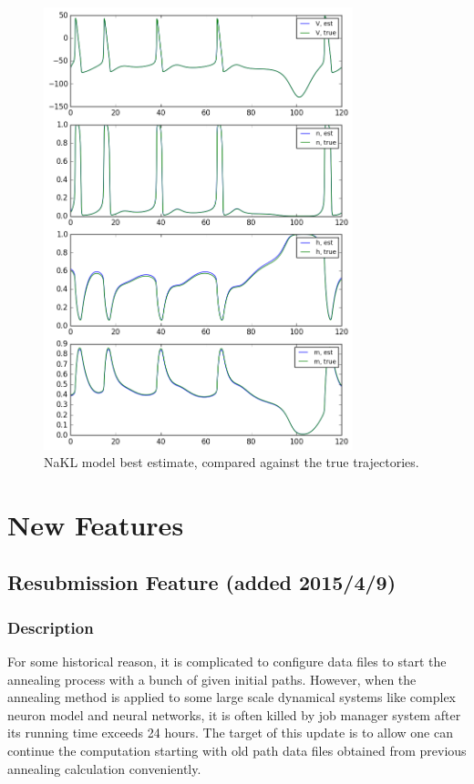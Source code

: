 \documentclass[11pt]{article}
\begin{document}
{\begin{figure}[h]
\centering
\includegraphics[width=0.8\textwidth]{figure/NaKL/estimation.png}
\caption{NaKL model best estimate, compared against the true trajectories.}
\label{fig:NaKL}
\end{figure}



\clearpage


\iffalse
\newpage
\section{New Features}
\subsection{ Resubmission Feature (added 2015/4/9)}
\subsubsection{Description}
For some historical reason, it is complicated to configure data files to start the annealing process with a bunch of given initial paths. However, when the annealing method is applied to some large scale dynamical systems like complex neuron model and neural networks, it is often killed by job manager system after its running time exceeds 24 hours. The target of this update is to allow one can continue the computation starting with old path data files obtained from previous annealing calculation conveniently.
}
\end{document}

